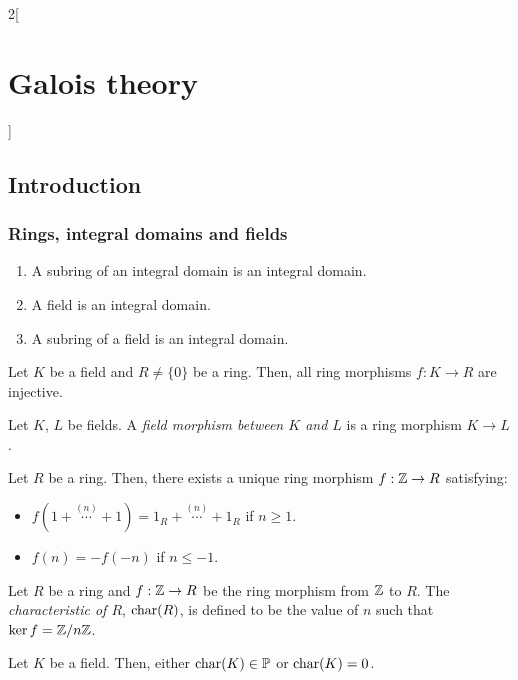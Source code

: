 \documentclass[../../../main.tex]{subfiles}
\begin{document}
\begin{multicols}{2}[\section{Galois theory}]
  \subsection{Introduction}
  \subsubsection*{Rings, integral domains and fields}
  \begin{prop}
    \hfill
    \begin{enumerate}
      \item A subring of an integral domain is an integral domain.
      \item A field is an integral domain.
      \item A subring of a field is an integral domain.
    \end{enumerate}
  \end{prop}
  \begin{lemma}
    Let $K$ be a field and $R\ne\{0\}$ be a ring. Then, all ring morphisms $f:K\rightarrow R$ are injective.
  \end{lemma}
  \begin{definition}
    Let $K$, $L$ be fields. A \textit{field morphism between $K$ and $L$} is a ring morphism $K\rightarrow L$.
  \end{definition}
  \begin{lemma}
    Let $R$ be a ring. Then, there exists a unique ring morphism $f:\mathbb{Z}\rightarrow R$ satisfying:
    \begin{itemize}
      \item $f(1+\overset{(n)}{\cdots}+1)=1_R+\overset{(n)}{\cdots}+1_R$ if $n\geq 1$.
      \item $f(n)=-f(-n)$ if $n\leq -1$.
    \end{itemize}
  \end{lemma}
  \begin{definition}
    Let $R$ be a ring and $f:\mathbb{Z}\rightarrow R$ be the ring morphism from $\mathbb{Z}$ to $R$. The \textit{characteristic of $R$}, $\operatorname{char} (R)$, is defined to be the value of $n$ such that $\ker f=\quot{\ZZ}{n\ZZ}$.
  \end{definition}
  \begin{prop}
    Let $K$ be a field. Then, either $\operatorname{char}(K)\in\mathbb{P}$ or $\operatorname{char}(K)=0$.

\end{prop}
\end{multicols}
\end{document}

